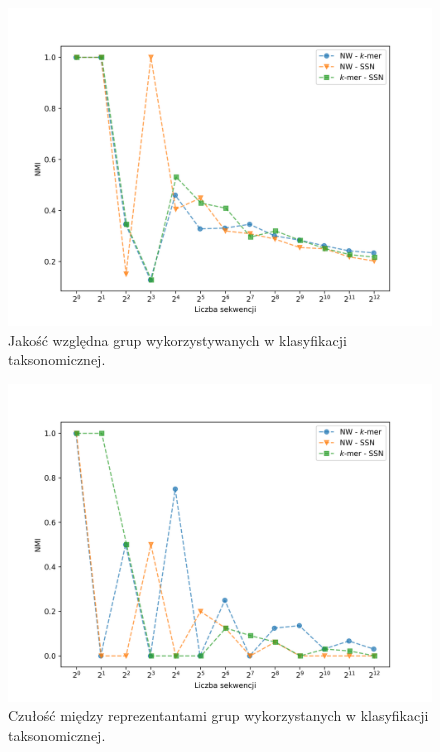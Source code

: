                 \begin{figure}[!htb]
                    \begin{center}
                        \includegraphics[width=\textwidth]{tex/pictures/exp/experiment_relative_quality_nmi.png}
                    \end{center}
                    \caption{
                       Jakość względna grup wykorzystywanych w klasyfikacji taksonomicznej.
                    }\label{Picture:Experiment:RelativeQualityNMI}
                \end{figure}

                \begin{figure}[!htb]
                    \begin{center}
                        \includegraphics[width=\textwidth]{tex/pictures/exp/experiment_relative_quality_sensitivity.png}
                    \end{center}
                    \caption{
                       Czułość między reprezentantami grup wykorzystanych w klasyfikacji taksonomicznej.
                    }\label{Picture:Experiment:RelativeQualitySensitivity}
                \end{figure}

